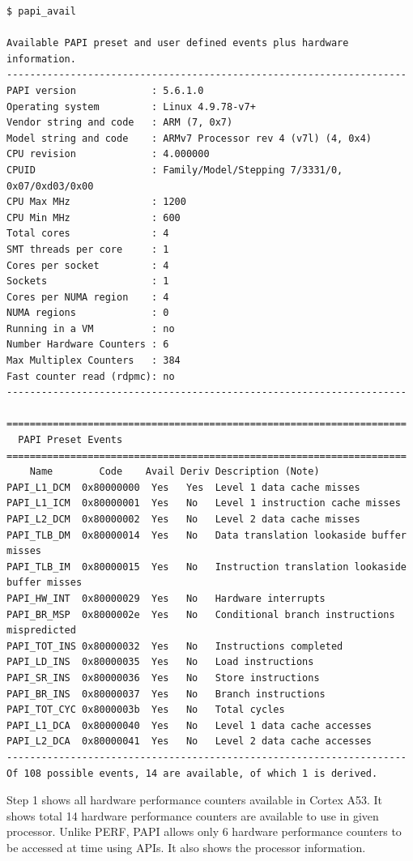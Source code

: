 \begin{lstlisting}
$ papi_avail

Available PAPI preset and user defined events plus hardware information.
---------------------------------------------------------------------
PAPI version             : 5.6.1.0
Operating system         : Linux 4.9.78-v7+
Vendor string and code   : ARM (7, 0x7)
Model string and code    : ARMv7 Processor rev 4 (v7l) (4, 0x4)
CPU revision             : 4.000000
CPUID                    : Family/Model/Stepping 7/3331/0, 0x07/0xd03/0x00
CPU Max MHz              : 1200
CPU Min MHz              : 600
Total cores              : 4
SMT threads per core     : 1
Cores per socket         : 4
Sockets                  : 1
Cores per NUMA region    : 4
NUMA regions             : 0
Running in a VM          : no
Number Hardware Counters : 6
Max Multiplex Counters   : 384
Fast counter read (rdpmc): no
---------------------------------------------------------------------

=====================================================================
  PAPI Preset Events
=====================================================================
    Name        Code    Avail Deriv Description (Note)
PAPI_L1_DCM  0x80000000  Yes   Yes  Level 1 data cache misses
PAPI_L1_ICM  0x80000001  Yes   No   Level 1 instruction cache misses
PAPI_L2_DCM  0x80000002  Yes   No   Level 2 data cache misses
PAPI_TLB_DM  0x80000014  Yes   No   Data translation lookaside buffer misses
PAPI_TLB_IM  0x80000015  Yes   No   Instruction translation lookaside buffer misses
PAPI_HW_INT  0x80000029  Yes   No   Hardware interrupts
PAPI_BR_MSP  0x8000002e  Yes   No   Conditional branch instructions mispredicted
PAPI_TOT_INS 0x80000032  Yes   No   Instructions completed
PAPI_LD_INS  0x80000035  Yes   No   Load instructions
PAPI_SR_INS  0x80000036  Yes   No   Store instructions
PAPI_BR_INS  0x80000037  Yes   No   Branch instructions
PAPI_TOT_CYC 0x8000003b  Yes   No   Total cycles
PAPI_L1_DCA  0x80000040  Yes   No   Level 1 data cache accesses
PAPI_L2_DCA  0x80000041  Yes   No   Level 2 data cache accesses
---------------------------------------------------------------------
Of 108 possible events, 14 are available, of which 1 is derived.

\end{lstlisting}

\par Step 1 shows all hardware performance counters available in Cortex A53. It shows total 14 hardware performance counters are available to use in given processor. Unlike PERF, PAPI allows only 6 hardware performance counters to be accessed at time using APIs. It also shows the processor information. 

